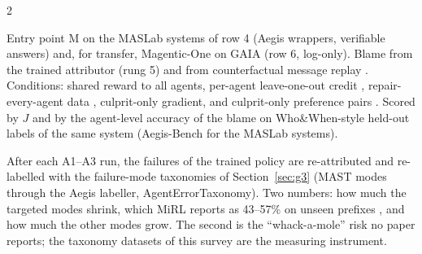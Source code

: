 \begin{multicols}{2}
\begin{description}[leftmargin=1.4em,style=nextline,itemsep=1pt]
\item[A3 --- Culprit-only updates in a multi-agent system.] Entry point M on the MASLab systems of row 4 (Aegis wrappers, verifiable answers) and, for transfer, Magentic-One on GAIA (row 6, log-only). Blame from the trained attributor (rung 5) and from counterfactual message replay \cite{chen2026c3}. Conditions: shared reward to all agents, per-agent leave-one-out credit \cite{li2026sharp}, repair-every-agent data \cite{zhao2025sirius}, culprit-only gradient, and culprit-only preference pairs \cite{yang2025blame}. Scored by $J$ and by the agent-level accuracy of the blame on Who\&When-style held-out labels of the same system (Aegis-Bench for the MASLab systems).
\item[A4 --- Closing the loop.] After each A1--A3 run, the failures of the trained policy are re-attributed and re-labelled with the failure-mode taxonomies of Section~\ref{sec:g3} (MAST modes through the Aegis labeller, AgentErrorTaxonomy). Two numbers: how much the targeted modes shrink, which MiRL reports as 43--57\% on unseen prefixes \cite{tian2026mirl}, and how much the other modes grow. The second is the ``whack-a-mole'' risk no paper reports; the taxonomy datasets of this survey are the measuring instrument.
\end{description}


\end{multicols}
